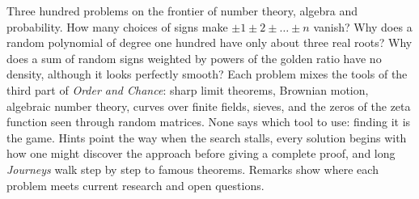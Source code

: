 Three hundred problems on the frontier of number theory, algebra and probability. How many choices of signs make
$\pm1\pm2\pm\dots\pm n$ vanish? Why does a random polynomial of degree one hundred have only about three real roots? Why does a
sum of random signs weighted by powers of the golden ratio have no density, although it looks perfectly smooth? Each problem
mixes the tools of the third part of \emph{Order and Chance}: sharp limit theorems, Brownian motion, algebraic number theory,
curves over finite fields, sieves, and the zeros of the zeta function seen through random matrices. None says which tool to
use: finding it is the game. Hints point the way when the search stalls, every solution begins with how one might discover
the approach before giving a complete proof, and long \emph{Journeys} walk step by step to famous theorems. Remarks show
where each problem meets current research and open questions.
